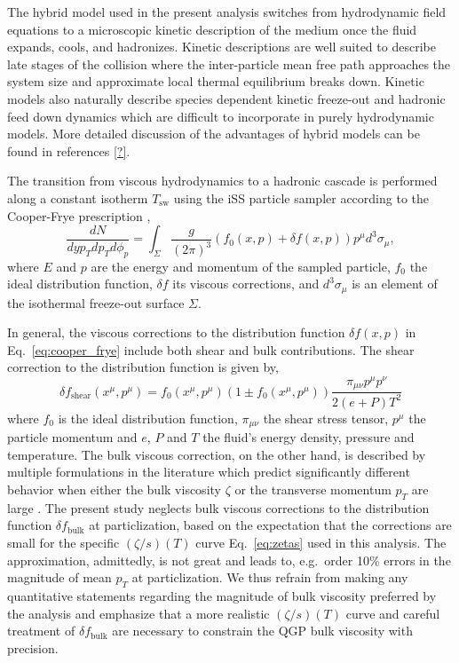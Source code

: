 \documentclass[aps,prc,reprint,amsmath,nofootinbib,superscriptaddress]{revtex4-1}
\begin{document}
The hybrid model used in the present analysis switches from hydrodynamic field equations to a microscopic kinetic description of the medium once the fluid expands, cools, and hadronizes. Kinetic descriptions are well suited to describe late stages of the collision where the inter-particle mean free path approaches the system size and approximate local thermal equilibrium breaks down.
Kinetic models also naturally describe species dependent kinetic freeze-out and hadronic feed down dynamics which are difficult to incorporate in purely hydrodynamic models.
More detailed discussion of the advantages of hybrid models can be found in references \ref{?}.

The transition from viscous hydrodynamics to a hadronic cascade is performed along a constant isotherm $T_\text{sw}$ using the iSS particle sampler \cite{Shen:2014vra, Qiu:2013wca} according to the Cooper-Frye prescription \cite{Cooper:1974mv},
\begin{equation}
  \frac{dN}{dy p_T dp_T d\phi_p} =
    \int_\Sigma \frac{g}{(2\pi)^3} (f_0(x,p) + \delta f(x,p)) p^\mu d^3 \sigma_\mu,
  \label{eq:cooper_frye}
\end{equation}
where $E$ and $p$ are the energy and momentum of the sampled particle, $f_0$ the ideal distribution function, $\delta f$ its viscous corrections, and $d^3\sigma_\mu$ is an element of the isothermal freeze-out surface $\Sigma$.

In general, the viscous corrections to the distribution function $\delta f(x, p)$ in Eq.~\eqref{eq:cooper_frye} include both shear and bulk contributions.
The shear correction to the distribution function is given by,
\begin{equation}
  \delta f_\text{shear}(x^\mu, p^\mu) =
    f_0(x^\mu, p^\mu)(1 \pm f_0(x^\mu, p^\mu))
    \frac{\pi_{\mu\nu}p^\mu p^\nu}{2(e+P)T^2}
\end{equation}
where $f_0$ is the ideal distribution function, $\pi_{\mu\nu}$ the shear stress tensor, $p^\mu$ the particle momentum and $e$, $P$ and $T$ the fluid's energy density, pressure and temperature.
The bulk viscous correction, on the other hand, is described by multiple formulations in the literature which predict significantly different behavior when either the bulk viscosity $\zeta$ or the transverse momentum $p_T$ are large \cite{Dusling:2011fd, Noronha-Hostler:2013gga}. The present study neglects bulk viscous corrections to the distribution function $\delta f_\text{bulk}$ at particlization, based on the expectation that the corrections are small for the specific $(\zeta/s)(T)$ curve Eq.~\eqref{eq:zetas} used in this analysis. The approximation, admittedly, is not great and leads to, e.g.\ order 10\% errors in the magnitude of mean $p_T$ at particlization. We thus refrain from making any quantitative statements regarding the magnitude of bulk viscosity preferred by the analysis and emphasize that a more realistic $(\zeta/s)(T)$ curve and careful treatment of $\delta f_\text{bulk}$ are necessary to constrain the QGP bulk viscosity with precision.
\end{document}
